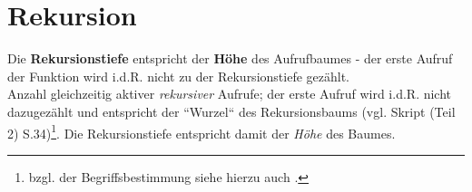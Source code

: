 \section{Rekursion}

Die \textbf{Rekursionstiefe} entspricht der \textbf{Höhe} des Aufrufbaumes - der erste Aufruf der Funktion wird i.d.R. nicht zu der Rekursionstiefe gezählt.\\

\noindent
Anzahl gleichzeitig aktiver \textit{rekursiver} Aufrufe; der erste Aufruf wird i.d.R. nicht dazugezählt und entspricht der ``Wurzel`` des Rekursionsbaums (vgl. Skript (Teil 2) S.34)\footnote{
bzgl. der Begriffsbestimmung siehe hierzu auch \cite[144 f.]{CK75}.
}.
Die Rekursionstiefe entspricht damit der \textit{Höhe} des Baumes.